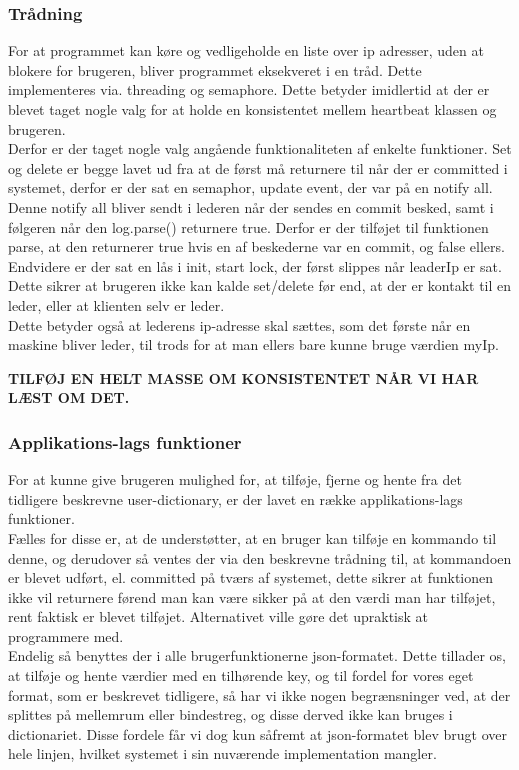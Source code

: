 \documentclass[a4paper,12pt]{article}
\begin{document}
\subsubsection{Trådning}
For at programmet kan køre og vedligeholde en liste over ip adresser, uden at blokere for brugeren, bliver programmet eksekveret i en tråd. Dette implementeres via. threading og semaphore. Dette betyder imidlertid at der er blevet taget nogle valg for at holde en konsistentet mellem heartbeat klassen og brugeren.
\\ 
Derfor er der taget nogle valg angående funktionaliteten af enkelte funktioner.
Set og delete er begge lavet ud fra at de først må returnere til når der er committed i systemet, derfor er der sat en semaphor, update event, der var på en notify all. Denne notify all bliver sendt i lederen når der sendes en commit besked, samt i følgeren når den log.parse() returnere true. Derfor er der tilføjet til funktionen parse, at den returnerer true hvis en af beskederne var en commit, og false ellers.
\\
Endvidere er der sat en lås i init, start lock, der først slippes når leaderIp er sat. Dette sikrer at brugeren ikke kan kalde set/delete før end, at der er kontakt til en leder, eller at klienten selv er leder.
\\
Dette betyder også at lederens ip-adresse skal sættes, som det første når en maskine bliver leder, til trods for at man ellers bare kunne bruge værdien myIp. 

\textbf{TILFØJ EN HELT MASSE OM KONSISTENTET NÅR VI HAR LÆST OM DET.}


\subsubsection{Applikations-lags funktioner}
For at kunne give brugeren mulighed for, at tilføje, fjerne og hente fra det tidligere beskrevne user-dictionary, er der lavet en række applikations-lags funktioner. \\
Fælles for disse er, at de understøtter, at en bruger kan tilføje en kommando til denne, og derudover så ventes der via den beskrevne trådning til, at kommandoen er blevet udført, el. committed på tværs af systemet, dette sikrer at funktionen ikke vil returnere førend man kan være sikker på at den værdi man har tilføjet, rent faktisk er blevet tilføjet. Alternativet ville gøre det upraktisk at programmere med.
\\[5px]
Endelig så benyttes der i alle brugerfunktionerne json-formatet. Dette tillader os, at tilføje og hente værdier med en tilhørende key, og til fordel for vores eget format, som er beskrevet tidligere, så har vi ikke nogen begrænsninger ved, at der splittes på mellemrum eller bindestreg, og disse derved ikke kan bruges i dictionariet. Disse fordele får vi dog kun såfremt at json-formatet blev brugt over hele linjen, hvilket systemet i sin nuværende implementation mangler.
\newpage
\end{document}
